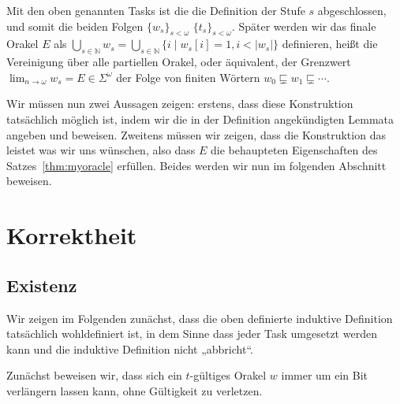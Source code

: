 Mit den oben genannten Tasks ist die die Definition der Stufe $s$ abgeschlossen, und somit die beiden Folgen $\{w_s\}_{s<\omega}$ $\{t_s\}_{s<\omega}$.
Später werden wir das finale Orakel $E$ als $\bigcup_{s\in\mathbb N} w_s = \bigcup_{s\in\mathbb N} \{ i \mid w_s[i]=1, i<|w_s|\} $ definieren, heißt die Vereinigung über alle partiellen Orakel, oder äquivalent, der Grenzwert $\lim_{n\to\omega} w_s = E\in\Sigma^\omega$ der Folge von finiten Wörtern $w_0\sqsubsetneq  w_1\sqsubsetneq \cdots$.

Wir müssen nun zwei Aussagen zeigen: erstens, dass diese Konstruktion tatsächlich möglich ist, indem wir die in der Definition angekündigten Lemmata angeben und beweisen.
Zweitens müssen wir zeigen, dass die Konstruktion das leistet was wir uns wünschen, also dass $E$ die behaupteten Eigenschaften des Satzes~\ref{thm:myoracle} erfüllen.
Beides werden wir nun im folgenden Abschnitt beweisen.

\section{Korrektheit}\label{sec:oracle-correctness}

\subsection*{Existenz}

Wir zeigen im Folgenden zunächst, dass die oben definierte induktive Definition tatsächlich wohldefiniert ist, in dem Sinne dass jeder Task umgesetzt werden kann und die induktive Definition nicht „abbricht“.

Zunächst beweisen wir, dass sich ein $t$-gültiges Orakel $w$ immer um ein Bit verlängern lassen kann, ohne Gültigkeit zu verletzen.

